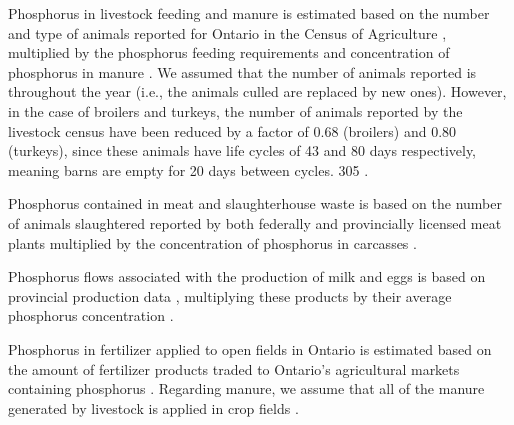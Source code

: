 \documentclass[authoryear]{elsarticle}
\begin{document}
Phosphorus in livestock feeding and manure
is estimated based on the number and type of animals reported for Ontario
in the Census of Agriculture \citep{LivestockCensusCattle,LivestockCensusSheep,LivestockCensusPig,LivestockCensusPoultry,LivestockCensusOtherLivestock}, multiplied by the phosphorus feeding requirements and concentration of phosphorus in manure \citep{NetherlandsCompositions,BrownCompositions, VanStaden2021}.
We assumed that the number of animals reported is throughout the year (i.e., the animals culled are replaced by new ones). However, in the case of broilers and turkeys, the number of animals reported by the livestock census have been reduced by a factor of 0.68 (broilers) and 0.80 (turkeys), since these animals have life cycles of 43 and 80 days respectively, meaning barns are empty for 20 days between cycles. 305 \citep{yang2007development}.

Phosphorus contained in meat and slaughterhouse waste is based on the number of animals slaughtered reported by both federally and provincially licensed meat plants \citep{SlaughterFederalRedMeat, SlaughterFederalPoultry} multiplied by the concentration of phosphorus in carcasses \citep{LivetoCarcassWeight,hayse1973eviscerated,brake1995relationship,NetherlandsCompositions}.

Phosphorus flows associated with the production of milk and eggs is based on provincial production data \citep{MilkOntario,EggOntario}, multiplying these products by their average phosphorus concentration \citep{NutrientValueHealthCanada,chambers2017chicken}.

Phosphorus in fertilizer applied to open fields in Ontario is estimated based on the amount of fertilizer products traded to Ontario’s agricultural markets containing phosphorus \citep{FertilizerShipments}. 
Regarding manure, we assume that all of the manure generated by livestock is applied in crop fields \citep{IROWC_PHandbook}.
\end{document}
